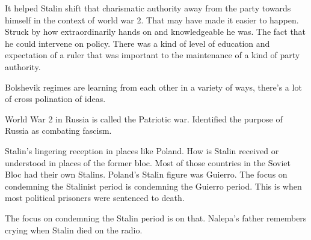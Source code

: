 \documentclass{article}
\begin{document}
\vspace{3mm}

It helped Stalin shift that charismatic authority away from the party towards himself in the context of world war 2.  That may have made it easier to happen.  Struck by how extraordinarily hands on and knowledgeable he was.  The fact that he could intervene on policy.  There was a kind of level of education and expectation of a ruler that was important to the maintenance of a kind of party authority.  

\vspace{3mm}

Bolshevik regimes are learning from each other in a variety of ways, there's a lot of cross polination of ideas.  

\vspace{3mm}

World War 2 in Russia is called the Patriotic war.  Identified the purpose of Russia as combating fascism.  

\vspace{3mm}

Stalin's lingering reception in places like Poland.  How is Stalin received or understood in places of the former bloc.  Most of those countries in the Soviet Bloc had their own Stalins.  Poland's Stalin figure was Guierro.  The focus on condemning the Stalinist period is condemning the Guierro period.  This is when most political prisoners were sentenced to death.  

\vspace{3mm}

The focus on condemning the Stalin period is on that.  Nalepa's father remembers crying when Stalin died on the radio.  

\vspace{3mm}
\end{document}
